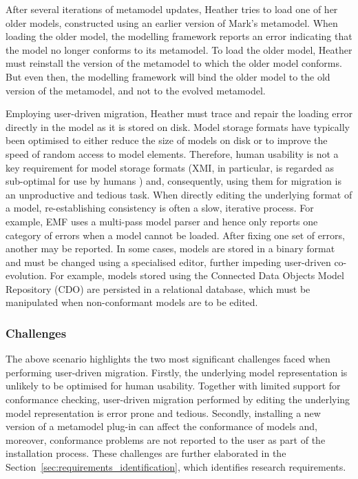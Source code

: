 After several iterations of metamodel updates, Heather tries to load one of her older models, constructed using an earlier version of Mark's metamodel. When loading the older model, the modelling framework reports an error indicating that the model no longer conforms to its metamodel. To load the older model, Heather must reinstall the version of the metamodel to which the older model conforms. But even then, the modelling framework will bind the older model to the old version of the metamodel, and not to the evolved metamodel.

Employing user-driven migration, Heather must trace and repair the loading error directly in the model as it is stored on disk. Model storage formats have typically been optimised to either reduce the size of models on disk or to improve the speed of random access to model elements. Therefore, human usability is not a key requirement for model storage formats (XMI, in particular, is regarded as sub-optimal for use by humans \cite{hutn}) and, consequently, using them for migration is an unproductive and tedious task. When directly editing the underlying format of a model, re-establishing consistency is often a slow, iterative process. For example, EMF uses a multi-pass model parser and hence only reports one category of errors when a model cannot be loaded. After fixing one set of errors, another may be reported. In some cases, models are stored in a binary format and must be changed using a specialised editor, further impeding user-driven co-evolution. For example, models stored using the Connected Data Objects Model Repository (CDO) \cite{cdo} are persisted in a relational database, which must be manipulated when non-conformant models are to be edited. 

\subsubsection{Challenges}
The above scenario highlights the two most significant challenges faced when performing user-driven migration. Firstly, the underlying model representation is unlikely to be optimised for human usability. Together with limited support for conformance checking, user-driven migration performed by editing the underlying model representation is error prone and tedious. Secondly, installing a new version of a metamodel plug-in can affect the conformance of models and, moreover, conformance problems are not reported to the user as part of the installation process. These challenges are further elaborated in the Section~\ref{sec:requirements_identification}, which identifies research requirements.

